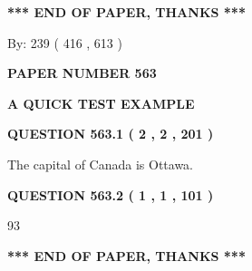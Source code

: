 \documentclass[12pt]{article}
\begin{document}
 
   
   
 \vspace{0.2in}
 
   
   
   
   
\vspace{1.0in} 
{\textbf{\large{ *** END OF PAPER, THANKS *** }}} 
   
   
\hspace{1.0in} By: 
 239 ( 416 ,  613 )
   
   
   
   
\newpage 
\setcounter{page}{ 
   563001 } 
   
   
   
   
 {\textbf{ \Large{ PAPER NUMBER  563  }}}
   
   
\vspace{0.2in}
   
   
   
   
   
   
 \vspace{0.2in}
{\LARGE {\textbf{ A QUICK TEST EXAMPLE}}}
   
   
  
\vspace{0.2in}
  
{\textbf{\Large{QUESTION
563.1 
 ( 2 , 2 , 201 )
}}}
  
  
 
 
\noindent{}
 
 
The capital of Canada is Ottawa.
 
 
 
 
  
\vspace{0.2in}
  
{\textbf{\Large{QUESTION
563.2 
 ( 1 , 1 , 101 )
}}}
  
  
 
 
\noindent{}

93
 
 
   
   
 \vspace{0.2in}
 
   
   
   
   
\vspace{1.0in} 
{\textbf{\large{ *** END OF PAPER, THANKS *** }}} 
   
\end{document}

